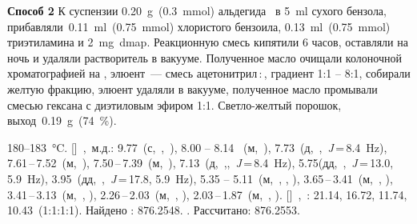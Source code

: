 \textbf{Способ 2} К суспензии \SI{0.20}{\gram}~(\SI{0.3}{\mmol}) альдегида~\textbf{} в \SI{5}{\milli\litre} сухого бензола, прибавляли~\SI{0.11}{\milli\litre}~(\SI{0.75}{\mmol}) хлористого бензоила, \SI{0.13}{\milli\litre}~(\SI{0.75}{\mmol}) триэтиламина и \SI{2}{\milli\gram}~\ac{dmap}.
Реакционную смесь кипятили 6 часов, оставляли на ночь и удаляли растворитель в вакууме.
Полученное масло очищали колоночной хроматографией на , элюент~--- смесь ацетонитрил\,:\,, градиент 1:1 -- 8:1, собирали желтую фракцию, элюент удаляли в вакууме, полученное масло промывали смесью гексана с диэтиловым эфиром 1:1. Светло-желтый порошок, выход~\SI{0.19}{\gram}~(\SI{74}{\percent}).
\begin{experimental}
     180--\SI{183}{\celsius}.
    []~\chemdelta,~м.д.: 9.77~(с,~,~), 8.00 -- 8.14 ~(м,~), 7.73~(д,~,~\textit{J}\,=\,8.4~\si{\hertz}), 7.61\,--\,7.52~(м,~), 7.50\,--\,7.39~(м,~), 7.13~(д,~,,~\textit{J}\,=\,8.4~\si{\hertz}), 5.75(дд,~,~\textit{J}\,=\,13.0, 5.9~\si{\hertz}), 3.95~(дд,~,~\textit{J}\,=\,17.8, 5.9~\si{\hertz}), 5.35 -- 5.11~(м,~, , ), 3.65\,--\,3.41~(м,~, ), 3.41\,--\,3.13~(м,~, ), 2.26\,--\,2.03~(м,~, ), 2.03\,--\,1.87~(м,~, ).
    []~\chemdelta,~\si{\ppm}: 21.14, 16.72, 11.74, 10.43~(1:1:1:1).
     Найдено \ce{[M+]}: \num{876.2548}. . Рассчитано:  \num{876.2553}.
\end{experimental}

